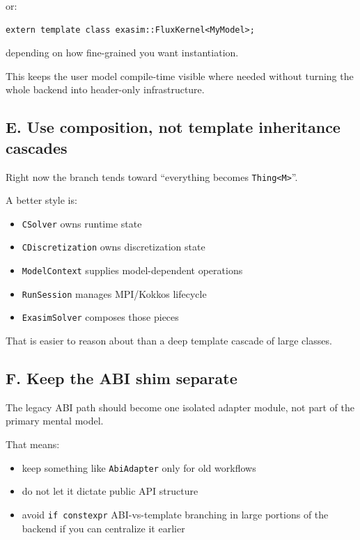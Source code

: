 \documentclass[11pt]{article}
\begin{document}
or:

\begin{verbatim}
extern template class exasim::FluxKernel<MyModel>;
\end{verbatim}

depending on how fine-grained you want instantiation.

This keeps the user model compile-time visible where needed without turning the whole backend into header-only infrastructure.

\subsection*{E. Use composition, not template inheritance cascades}

Right now the branch tends toward ``everything becomes \texttt{Thing<M>}''.

A better style is:

\begin{itemize}[leftmargin=*]
\item \texttt{CSolver} owns runtime state
\item \texttt{CDiscretization} owns discretization state
\item \texttt{ModelContext} supplies model-dependent operations
\item \texttt{RunSession} manages MPI/Kokkos lifecycle
\item \texttt{ExasimSolver} composes those pieces
\end{itemize}

That is easier to reason about than a deep template cascade of large classes.

\subsection*{F. Keep the ABI shim separate}

The legacy ABI path should become one isolated adapter module, not part of the primary mental model.

That means:

\begin{itemize}[leftmargin=*]
\item keep something like \texttt{AbiAdapter} only for old workflows
\item do not let it dictate public API structure
\item avoid \texttt{if constexpr} ABI-vs-template branching in large portions of the backend if you can centralize it earlier
\end{itemize}
\end{document}
